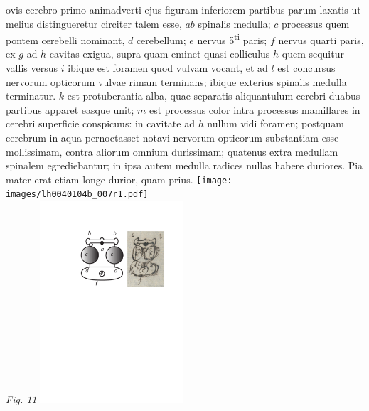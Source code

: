 \pend
\vspace{1.0em}%
\count{}
\count{}
\count{}
\pstart%
\noindent%
 ovis cerebro primo animadverti ejus figuram inferiorem partibus parum laxatis ut melius distingueretur circiter talem esse, $ab$ spinalis medulla; $c$ processus quem pontem cerebelli nominant, $d$ cerebellum; $e$ nervus 5\textsuperscript{ti} paris; $f$ nervus quarti paris, ex $g$ ad $h$ cavitas exigua, supra quam eminet quasi colliculus $h$ quem sequitur vallis versus $i$ ibique est foramen quod vulvam vocant, et ad $l$ est concursus nervorum opticorum vulvae rimam terminans; ibique exterius spinalis medulla terminatur. $k$ est protuberantia alba, quae separatis aliquantulum cerebri duabus partibus apparet easque unit; $m$ est processus
color intra processus mamillares in cerebri superficie conspicuus: in cavitate ad $h$ nullum vidi foramen; postquam cerebrum in aqua pernoctasset notavi nervorum opticorum substantiam esse mollissimam, contra aliorum omnium durissimam; quatenus extra medullam spinalem egrediebantur; in ipsa autem medulla radices nullas habere duriores. Pia mater erat etiam longe durior, quam prius.
\pend
\newpage
\pstart
\centering
\texttt{[image: images/lh0040104b\_007r1.pdf]}\\
\centering \lbrack\textit{Fig. 11}\rbrack
\pend
\newpage
\pstart%
\centering
 \includegraphics[trim = 0mm 0mm 0mm 0mm, clip, width=0.4\textwidth]{images/lh0040104b_007r2.pdf}\\
